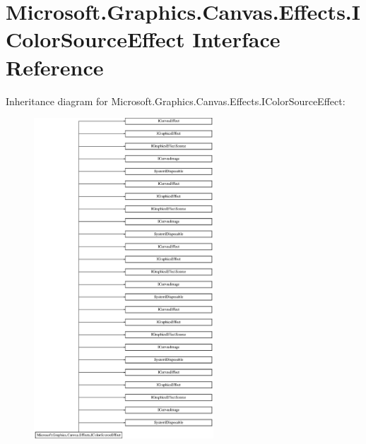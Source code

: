 \hypertarget{interface_microsoft_1_1_graphics_1_1_canvas_1_1_effects_1_1_i_color_source_effect}{}\section{Microsoft.\+Graphics.\+Canvas.\+Effects.\+I\+Color\+Source\+Effect Interface Reference}
\label{interface_microsoft_1_1_graphics_1_1_canvas_1_1_effects_1_1_i_color_source_effect}
Inheritance diagram for Microsoft.\+Graphics.\+Canvas.\+Effects.\+I\+Color\+Source\+Effect\+:\begin{figure}[H]
\begin{center}
\leavevmode
\includegraphics[height=12.000000cm]{interface_microsoft_1_1_graphics_1_1_canvas_1_1_effects_1_1_i_color_source_effect}
\end{center}
\end{figure}
